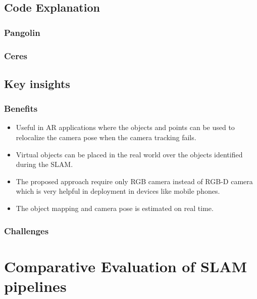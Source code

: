 \documentclass[report.tex]{subfiles}
\begin{document}
\subsection{Code Explanation}
\subsubsection{Pangolin}
\subsubsection{Ceres}

\subsection{Key insights}
\subsubsection{Benefits}
\begin{itemize}
    \item Useful in AR applications where the objects and points can be used to relocalize the camera pose when the camera tracking fails.
    \item Virtual objects can be placed in the real world over the objects identified during the SLAM.
    \item The proposed approach require only RGB camera instead of RGB-D camera which is very helpful in deployment in devices like mobile phones.
    \item The object mapping and camera pose is estimated on real time.
\end{itemize}
\subsubsection{Challenges}


\section{Comparative Evaluation of SLAM pipelines}
\end{document}
